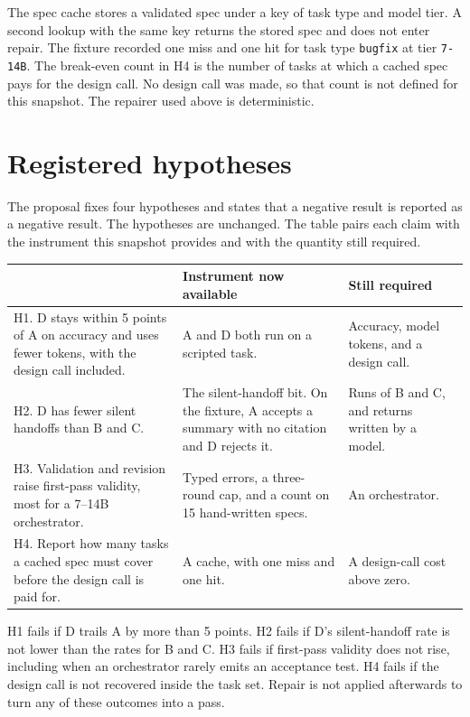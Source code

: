 \documentclass[10pt,a4paper]{article}
\begin{document}
The spec cache stores a validated spec under a key of task type and model tier. A second lookup with the same key returns the stored spec and does not enter repair. The fixture recorded one miss and one hit for task type \texttt{bugfix} at tier \texttt{7-14B}. The break-even count in H4 is the number of tasks at which a cached spec pays for the design call. No design call was made, so that count is not defined for this snapshot. The repairer used above is deterministic.

\section{Registered hypotheses}
\label{sec:hyp}

The proposal fixes four hypotheses and states that a negative result is reported as a negative result. The hypotheses are unchanged. The table pairs each claim with the instrument this snapshot provides and with the quantity still required.

\begin{table}[H]
\centering
\footnotesize
\begin{tabularx}{\textwidth}{@{}>{\hsize}Y>{\hsize}Y>{\hsize}Y@{}}
\toprule
 & Instrument now available & Still required \\
\midrule
H1. D stays within 5 points of A on accuracy and uses fewer tokens, with the design call included. & A and D both run on a scripted task. & Accuracy, model tokens, and a design call. \\
H2. D has fewer silent handoffs than B and C. & The silent-handoff bit. On the fixture, A accepts a summary with no citation and D rejects it. & Runs of B and C, and returns written by a model. \\
H3. Validation and revision raise first-pass validity, most for a 7--14B orchestrator. & Typed errors, a three-round cap, and a count on 15 hand-written specs. & An orchestrator. \\
H4. Report how many tasks a cached spec must cover before the design call is paid for. & A cache, with one miss and one hit. & A design-call cost above zero. \\
\bottomrule
\end{tabularx}
\end{table}

H1 fails if D trails A by more than 5 points. H2 fails if D's silent-handoff rate is not lower than the rates for B and C. H3 fails if first-pass validity does not rise, including when an orchestrator rarely emits an acceptance test. H4 fails if the design call is not recovered inside the task set. Repair is not applied afterwards to turn any of these outcomes into a pass.
\end{document}
